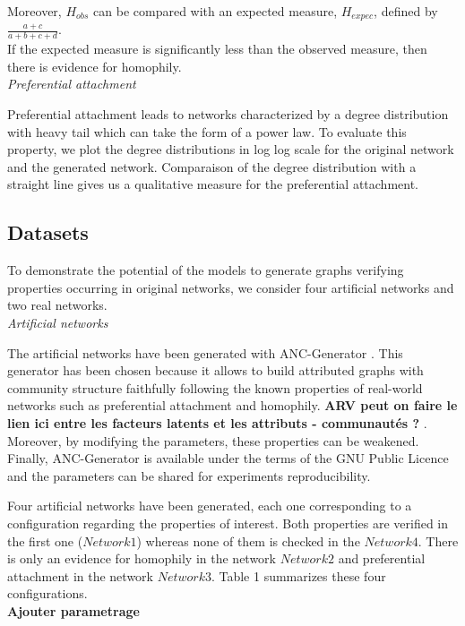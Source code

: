 Moreover, $H_{obs}$ can be compared with an expected measure, $H_{expec}$, defined by  $ \frac{a+c}{a+b+c+d}$.\\

If the expected measure is significantly less than the observed measure, then there is evidence for homophily.\\

\textit{Preferential attachment}

Preferential attachment leads to networks characterized by a degree distribution with heavy tail which can take the form of a power law. To evaluate this property, we  plot the degree distributions in log log scale for the original network and the generated network. Comparaison of the degree distribution with a straight line gives us a qualitative measure for the preferential attachment.\\

\subsection{Datasets}
To demonstrate the potential of the models to generate graphs verifying properties occurring in original networks, we consider four artificial networks and two real networks.\\

\textit{Artificial networks}

The artificial networks have been generated with ANC-Generator \cite{largeron2015}. This generator has been chosen because it allows to build attributed graphs with community structure faithfully following the known properties of real-world networks such as preferential attachment and homophily. 
\textbf{ ARV peut on faire le lien ici entre les facteurs latents et les attributs - communautés ? }.
Moreover, by modifying the parameters, these properties can be weakened. Finally, ANC-Generator is available under the terms of the GNU Public Licence and the parameters can be shared for experiments reproducibility. 

Four artificial networks have been generated, each one corresponding to a configuration  regarding the properties of interest.
Both properties are verified in the first one ($Network1$) whereas none of them is checked in the $Network4$.  There is only an evidence for homophily in the network $Network2$ and  preferential attachment in the network  $Network3$. Table 1 summarizes these four configurations. \\ 

\textbf{Ajouter parametrage}  

